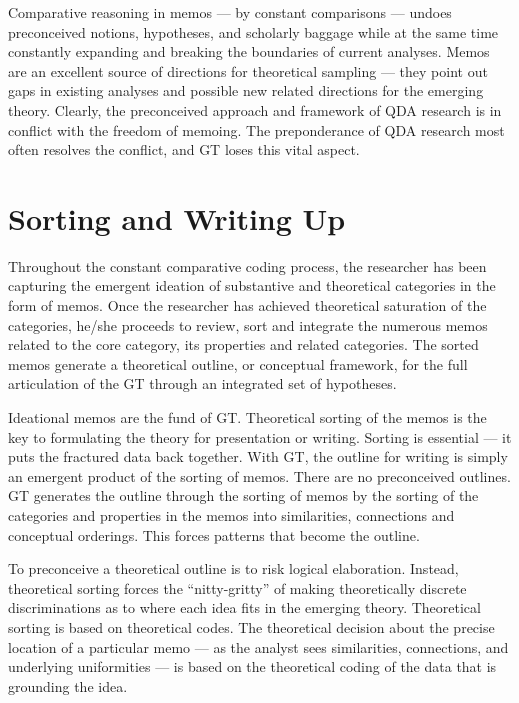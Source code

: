 Comparative reasoning in memos 
--- by constant comparisons 
--- undoes preconceived notions, hypotheses, and scholarly baggage while at the same time constantly expanding and breaking the boundaries of current analyses.
Memos are an excellent source of directions for theoretical sampling
--- they point out gaps in existing analyses and possible new related directions for the emerging theory. 
Clearly, the preconceived approach and framework of QDA research is in conflict with the freedom of memoing. 
The preponderance of QDA research most often resolves the conflict, and GT loses this vital aspect.

\section*{Sorting and Writing Up}

Throughout the constant comparative coding process, 
the researcher has been capturing the emergent ideation of substantive and theoretical categories in the form of memos. 
Once the researcher has achieved theoretical saturation of the categories, 
he/she proceeds to review, 
sort and integrate the numerous memos related to the core category, 
its properties and related categories. 
The sorted memos generate a theoretical outline, 
or conceptual framework, 
for the full articulation of the GT through an integrated set of hypotheses.

Ideational memos are the fund of GT. Theoretical sorting of the memos is the
key to formulating the theory for presentation or writing. 
Sorting is essential 
--- it puts the fractured data back together. 
With GT, 
the outline for writing is simply an emergent product of the sorting of memos. 
There are no preconceived outlines. 
GT generates the outline through the sorting of memos by the sorting of the categories and properties in the memos into similarities, 
connections and conceptual orderings. 
This forces patterns that become the outline.

To preconceive a theoretical outline is to risk logical elaboration. Instead,
theoretical sorting forces the “nitty-gritty” of making theoretically discrete
discriminations as to where each idea fits in the emerging theory. Theoretical
sorting is based on theoretical codes. 
The theoretical decision about the precise location of a particular memo
--- as the analyst sees similarities, connections, and underlying uniformities
--- is based on the theoretical coding of the data that is grounding the idea.



